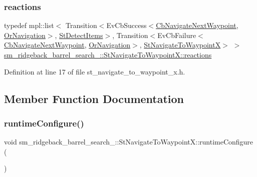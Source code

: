 \subsubsection{\texorpdfstring{reactions}{reactions}}
{\footnotesize\ttfamily typedef mpl\+::list$<$ Transition$<$Ev\+Cb\+Success$<$\hyperlink{classcl__move__base__z_1_1CbNavigateNextWaypoint}{Cb\+Navigate\+Next\+Waypoint}, \hyperlink{classsm__ridgeback__barrel__search__1_1_1OrNavigation}{Or\+Navigation}$>$, \hyperlink{structsm__ridgeback__barrel__search__1_1_1StDetectItems}{St\+Detect\+Items}$>$, Transition$<$Ev\+Cb\+Failure$<$\hyperlink{classcl__move__base__z_1_1CbNavigateNextWaypoint}{Cb\+Navigate\+Next\+Waypoint}, \hyperlink{classsm__ridgeback__barrel__search__1_1_1OrNavigation}{Or\+Navigation}$>$, \hyperlink{structsm__ridgeback__barrel__search__1_1_1StNavigateToWaypointX}{St\+Navigate\+To\+WaypointX}$>$ $>$ \hyperlink{structsm__ridgeback__barrel__search__1_1_1StNavigateToWaypointX_a7ccc105112324fc07f3a0d3a4acbbfec}{sm\+\_\+ridgeback\+\_\+barrel\+\_\+search\+\_\+::\+St\+Navigate\+To\+Waypoint\+X\+::reactions}}



Definition at line 17 of file st\+\_\+navigate\+\_\+to\+\_\+waypoint\+\_\+x.\+h.



\subsection{Member Function Documentation}
\mbox{\label{structsm__ridgeback__barrel__search__1_1_1StNavigateToWaypointX_a8619cadb86da6070f8d084f327563ca0}} 
\subsubsection{\texorpdfstring{runtime\+Configure()}{runtimeConfigure()}}
{\footnotesize\ttfamily void sm\+\_\+ridgeback\+\_\+barrel\+\_\+search\+\_\+::\+St\+Navigate\+To\+Waypoint\+X\+::runtime\+Configure (\begin{DoxyParamCaption}{ }\end{DoxyParamCaption})\hspace{0.3cm}{\ttfamily [inline]}}



